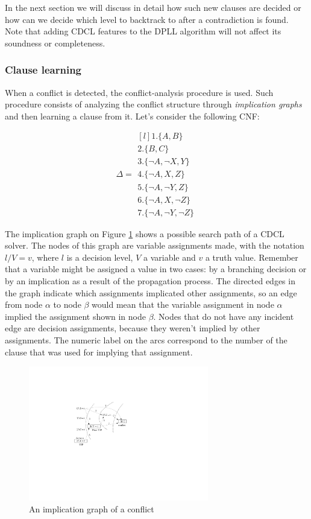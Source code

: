 \documentclass[12pt]{diicc}
\begin{document}
In the next section we will discuss in detail how such new clauses are decided or how can we decide which level to backtrack to after a contradiction is found. Note that adding CDCL features to the DPLL algorithm will not affect its soundness or completeness.

\subsubsection{Clause learning}

When a conflict is detected, the conflict-analysis procedure is used. Such procedure consists of analyzing the conflict structure through \textit{implication graphs} and then learning a clause from it. Let's consider the following CNF:

\begin{equation}\label{row sum}
\Delta = \begin{matrix*}[l]
			1.\{A,B\}\\
		 	2.\{B,C\}\\
		 	3.\{\neg A,\neg X,Y\}\\
		 	4.\{\neg A,X,Z\}\\
		 	5.\{\neg A,\neg Y,Z\}\\
		 	6.\{\neg A,X,\neg Z\}\\
		 	7.\{\neg A,\neg Y,\neg Z\}
		 \end{matrix*}
\end{equation}

The implication graph on Figure \ref{fig:uip} shows a possible search path of a CDCL solver. The nodes of this graph are variable assignments made, with the notation $l/V=v$, where $l$ is a decision level, $V$ a variable and $v$ a truth value. Remember that a variable might be assigned a value in two cases: by a branching decision or by an implication as a result of the propagation process. The directed edges in the graph indicate which assignments implicated other assignments, so an edge from node $\alpha$ to node $\beta$ would mean that the variable assignment in node $\alpha$ implied the assignment shown in node $\beta$. Nodes that do not have any incident edge are decision assignments, because they weren't implied by other assignments. The numeric label on the arcs correspond to the number of the clause that was used for implying that assignment. 

\begin{figure}[h!]
	\centering
		\includegraphics[width=0.7\textwidth]{uip}
	\caption{An implication graph of a conflict}
	\label{fig:uip}
\end{figure}
\end{document}
